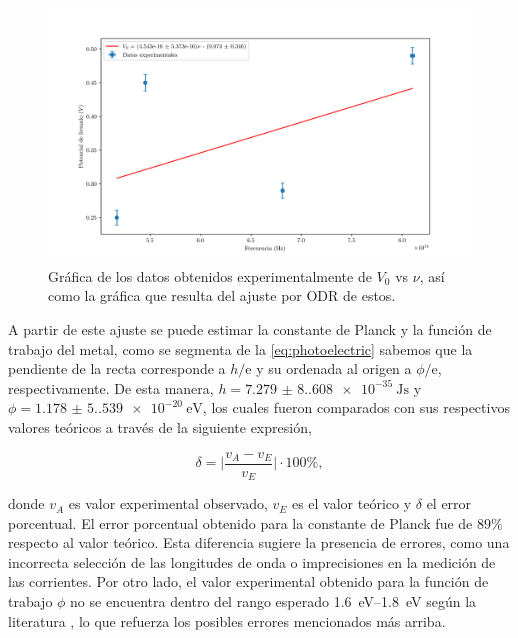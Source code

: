\documentclass[12pt]{IEEEtran}
\providecommand{\abs}[1]{\lvert#1\rvert}
\begin{document}
\begin{figure}[htp]
    \centering
    \includegraphics[width=\linewidth, trim={0 0 0.5cm 0.5cm},clip]{figs/potencial-frecencia.png}
    \caption{Gráfica de los datos obtenidos experimentalmente de \(V_{0}\) vs \(\nu\), así como la gráfica que resulta del ajuste por ODR de estos.}
    \label{fig:potencial-frecuencia}
\end{figure}

A partir de este ajuste se puede estimar la constante de Planck y la función de trabajo del metal, como se segmenta de la \cref{eq:photoelectric} sabemos que la pendiente de la recta corresponde a \(h/\mathrm{e}\) y su ordenada al origen a \(\phi/\mathrm{e}\), respectivamente. De esta manera, \(h = \qty[separate-uncertainty-units = bracket]{7.279(8.608)e-35}{\J\s}\) y \(\phi = \qty[separate-uncertainty-units = bracket]{1.178(5.539)e-20}{\eV}\), los cuales fueron comparados con sus respectivos valores teóricos a través de la siguiente expresión,

\begin{equation}
    \delta = \abs{\dfrac{v_{A}-v_{E}}{v_{E}}}\cdot 100\%,
\end{equation}

donde $v_{A}$ es valor experimental observado, $v_{E}$ es el valor teórico y $\delta$ el error porcentual. El error porcentual obtenido para la constante de Planck fue de $89\%$ respecto al valor teórico. Esta diferencia sugiere la presencia de errores, como una incorrecta selección de las longitudes de onda o imprecisiones en la medición de las corrientes. Por otro lado, el valor experimental obtenido para la función de trabajo \(\phi\) no se encuentra dentro del rango esperado \qtyrange[range-phrase=\text{--}]{1.6}{1.8}{\eV} según la literatura \cite{sakataStudiesCs3SbPhotoCathode1953,caulfieldCesiumAntimonyFilms1966}, lo que refuerza los posibles errores mencionados más arriba.
\end{document}
